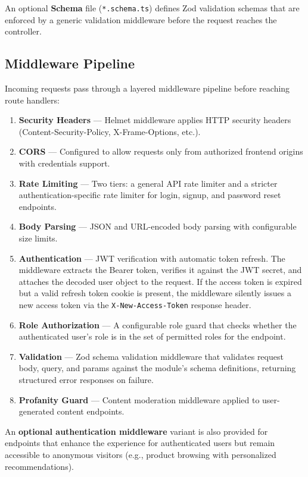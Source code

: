 An optional \textbf{Schema} file (\texttt{*.schema.ts}) defines Zod validation schemas that are enforced by a generic validation middleware before the request reaches the controller.

\subsection{Middleware Pipeline}
Incoming requests pass through a layered middleware pipeline before reaching route handlers:

\begin{enumerate}[leftmargin=*]
    \item \textbf{Security Headers} — Helmet middleware applies HTTP security headers (Content-Security-Policy, X-Frame-Options, etc.).
    \item \textbf{CORS} — Configured to allow requests only from authorized frontend origins with credentials support.
    \item \textbf{Rate Limiting} — Two tiers: a general API rate limiter and a stricter authentication-specific rate limiter for login, signup, and password reset endpoints.
    \item \textbf{Body Parsing} — JSON and URL-encoded body parsing with configurable size limits.
    \item \textbf{Authentication} — JWT verification with automatic token refresh. The middleware extracts the Bearer token, verifies it against the JWT secret, and attaches the decoded user object to the request. If the access token is expired but a valid refresh token cookie is present, the middleware silently issues a new access token via the \texttt{X-New-Access-Token} response header.
    \item \textbf{Role Authorization} — A configurable role guard that checks whether the authenticated user's role is in the set of permitted roles for the endpoint.
    \item \textbf{Validation} — Zod schema validation middleware that validates request body, query, and params against the module's schema definitions, returning structured error responses on failure.
    \item \textbf{Profanity Guard} — Content moderation middleware applied to user-generated content endpoints.
\end{enumerate}

An \textbf{optional authentication middleware} variant is also provided for endpoints that enhance the experience for authenticated users but remain accessible to anonymous visitors (e.g., product browsing with personalized recommendations).

